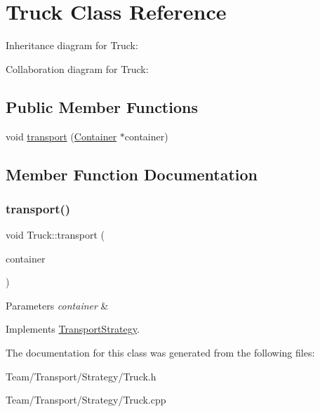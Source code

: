 \hypertarget{classTruck}{}\section{Truck Class Reference}
\label{classTruck}


Inheritance diagram for Truck\+:


Collaboration diagram for Truck\+:
\subsection*{Public Member Functions}
\begin{DoxyCompactItemize}
\item 
void \hyperlink{classTruck_a260ad20acea80d5b4faa2a9d97eaa8e9}{transport} (\hyperlink{classContainer}{Container} $\ast$container)
\end{DoxyCompactItemize}


\subsection{Member Function Documentation}
\mbox{\label{classTruck_a260ad20acea80d5b4faa2a9d97eaa8e9}} 
\subsubsection{\texorpdfstring{transport()}{transport()}}
{\footnotesize\ttfamily void Truck\+::transport (\begin{DoxyParamCaption}\item[{\hyperlink{classContainer}{Container} $\ast$}]{container }\end{DoxyParamCaption})\hspace{0.3cm}{\ttfamily [virtual]}}


\begin{DoxyParams}{Parameters}
{\em container} & \\
\hline
\end{DoxyParams}


Implements \hyperlink{classTransportStrategy_ab5659f9d5d352ba0a23f1e99edd3d488}{Transport\+Strategy}.



The documentation for this class was generated from the following files\+:\begin{DoxyCompactItemize}
\item 
Team/\+Transport/\+Strategy/Truck.\+h\item 
Team/\+Transport/\+Strategy/Truck.\+cpp\end{DoxyCompactItemize}
